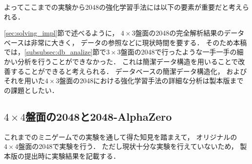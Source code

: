 よってここまでの実験から2048の強化学習手法には以下の要素が重要だと考えられる．

\ref{sec:solving_impl}節で述べるように， $4\times3$盤面の2048の完全解析結果のデータベースは非常に大きく， データの参照などに現状時間を要する．
そのため本稿では，\ref{subsubsec:db_analize}節で$3\times3$盤面の2048で行ったような一手一手の細かい分析を行うことができなかった．
これは簡潔データ構造を用いることで改善することができると考えられる．
データベースの簡潔データ構造化， およびそれを用いた$4\times3$盤面の2048における強化学習手法の詳細な分析は製本版までの課題としたい．

\subsection{$4\times4$盤面の2048と2048-AlphaZero}
これまでのミニゲームでの実験を通して得た知見を踏まえて， オリジナルの$4\times4$盤面の2048で実験を行う．
ただし現状十分な実験を行えていないため， 製本版の提出時に実験結果を記載する．